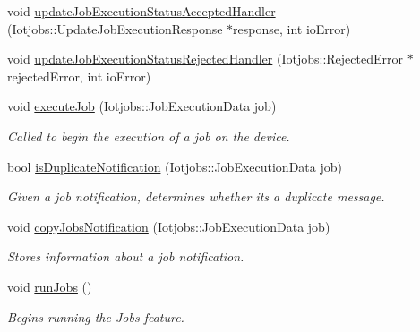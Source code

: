 \begin{DoxyCompactItemize}
void \hyperlink{class_aws_1_1_iot_1_1_device_client_1_1_jobs_1_1_jobs_feature_a5c763db4b185acc3beb7f292cab09f77}{update\+Job\+Execution\+Status\+Accepted\+Handler} (Iotjobs\+::\+Update\+Job\+Execution\+Response $\ast$response, int io\+Error)
\item 
void \hyperlink{class_aws_1_1_iot_1_1_device_client_1_1_jobs_1_1_jobs_feature_a15ac84770cecf46cd377c2f16d5994fa}{update\+Job\+Execution\+Status\+Rejected\+Handler} (Iotjobs\+::\+Rejected\+Error $\ast$rejected\+Error, int io\+Error)
\item 
void \hyperlink{class_aws_1_1_iot_1_1_device_client_1_1_jobs_1_1_jobs_feature_a021bbb91acaf6ef46ef41fb55ebff69e}{execute\+Job} (Iotjobs\+::\+Job\+Execution\+Data job)
\begin{DoxyCompactList}\small\item\em Called to begin the execution of a job on the device. \end{DoxyCompactList}\item 
bool \hyperlink{class_aws_1_1_iot_1_1_device_client_1_1_jobs_1_1_jobs_feature_a43ec792550c419ef608352d276f415c8}{is\+Duplicate\+Notification} (Iotjobs\+::\+Job\+Execution\+Data job)
\begin{DoxyCompactList}\small\item\em Given a job notification, determines whether it\textquotesingle{}s a duplicate message. \end{DoxyCompactList}\item 
void \hyperlink{class_aws_1_1_iot_1_1_device_client_1_1_jobs_1_1_jobs_feature_a9f121d4d293369a876b300d899f5867b}{copy\+Jobs\+Notification} (Iotjobs\+::\+Job\+Execution\+Data job)
\begin{DoxyCompactList}\small\item\em Stores information about a job notification. \end{DoxyCompactList}\item 
\mbox{\label{class_aws_1_1_iot_1_1_device_client_1_1_jobs_1_1_jobs_feature_ae42ed26b1a4bb83fe4f408f45729246f}} 
void \hyperlink{class_aws_1_1_iot_1_1_device_client_1_1_jobs_1_1_jobs_feature_ae42ed26b1a4bb83fe4f408f45729246f}{run\+Jobs} ()
\begin{DoxyCompactList}\small\item\em Begins running the Jobs feature. \end{DoxyCompactList}\end{DoxyCompactItemize}
